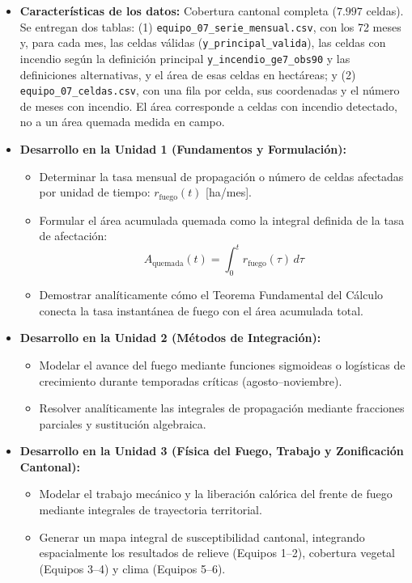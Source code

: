 \documentclass[11pt,a4paper]{article}
\begin{document}
\begin{itemize}[leftmargin=*,itemsep=1.5pt]
  \item \textbf{Características de los datos:} Cobertura cantonal completa ($7.997$ celdas). Se entregan dos tablas: (1) \texttt{equipo\_07\_\allowbreak serie\_\allowbreak mensual.csv}, con los 72 meses y, para cada mes, las celdas válidas (\texttt{y\_\allowbreak principal\_\allowbreak valida}), las celdas con incendio según la definición principal \texttt{y\_\allowbreak incendio\_\allowbreak ge7\_\allowbreak obs90} y las definiciones alternativas, y el área de esas celdas en hectáreas; y (2) \texttt{equipo\_07\_\allowbreak celdas.csv}, con una fila por celda, sus coordenadas y el número de meses con incendio. El área corresponde a celdas con incendio detectado, no a un área quemada medida en campo.
  \item \textbf{Desarrollo en la Unidad 1 (Fundamentos y Formulación):}
  \begin{itemize}
    \item Determinar la tasa mensual de propagación o número de celdas afectadas por unidad de tiempo: $r_{\text{fuego}}(t)$ [ha/mes].
    \item Formular el área acumulada quemada como la integral definida de la tasa de afectación:
    \begin{equation*}
      A_{\text{quemada}}(t) = \int_{0}^{t} r_{\text{fuego}}(\tau)\,d\tau
    \end{equation*}
    \item Demostrar analíticamente cómo el Teorema Fundamental del Cálculo conecta la tasa instantánea de fuego con el área acumulada total.
  \end{itemize}
  \item \textbf{Desarrollo en la Unidad 2 (Métodos de Integración):}
  \begin{itemize}
    \item Modelar el avance del fuego mediante funciones sigmoideas o logísticas de crecimiento durante temporadas críticas (agosto--noviembre).
    \item Resolver analíticamente las integrales de propagación mediante fracciones parciales y sustitución algebraica.
  \end{itemize}
  \item \textbf{Desarrollo en la Unidad 3 (Física del Fuego, Trabajo y Zonificación Cantonal):}
  \begin{itemize}
    \item Modelar el trabajo mecánico y la liberación calórica del frente de fuego mediante integrales de trayectoria territorial.
    \item Generar un mapa integral de susceptibilidad cantonal, integrando espacialmente los resultados de relieve (Equipos 1--2), cobertura vegetal (Equipos 3--4) y clima (Equipos 5--6).
  \end{itemize}
\end{itemize}
\end{document}
